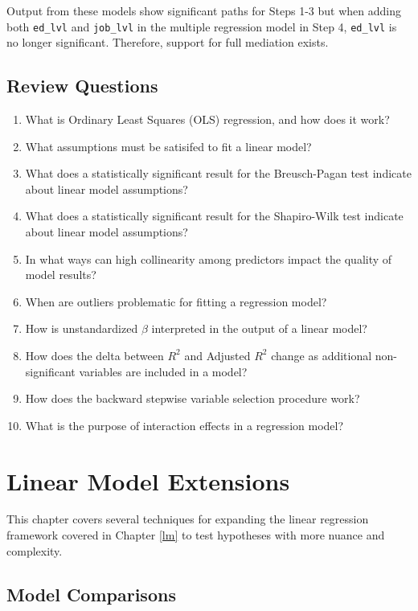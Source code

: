 \documentclass[
]{book}
\begin{document}
Output from these models show significant paths for Steps 1-3 but when adding both \texttt{ed\_lvl} and \texttt{job\_lvl} in the multiple regression model in Step 4, \texttt{ed\_lvl} is no longer significant. Therefore, support for full mediation exists.

\hypertarget{review-questions-8}{%
\section{Review Questions}\label{review-questions-8}}

\begin{enumerate}
\def\labelenumi{\arabic{enumi}.}
\item
  What is Ordinary Least Squares (OLS) regression, and how does it work?
\item
  What assumptions must be satisifed to fit a linear model?
\item
  What does a statistically significant result for the Breusch-Pagan test indicate about linear model assumptions?
\item
  What does a statistically significant result for the Shapiro-Wilk test indicate about linear model assumptions?
\item
  In what ways can high collinearity among predictors impact the quality of model results?
\item
  When are outliers problematic for fitting a regression model?
\item
  How is unstandardized \(\beta\) interpreted in the output of a linear model?
\item
  How does the delta between \(R^2\) and Adjusted \(R^2\) change as additional non-significant variables are included in a model?
\item
  How does the backward stepwise variable selection procedure work?
\item
  What is the purpose of interaction effects in a regression model?
\end{enumerate}

\hypertarget{lme}{%
\chapter{Linear Model Extensions}\label{lme}}

This chapter covers several techniques for expanding the linear regression framework covered in Chapter \ref{lm} to test hypotheses with more nuance and complexity.

\hypertarget{model-comparisons}{%
\section{Model Comparisons}\label{model-comparisons}}
\end{document}

